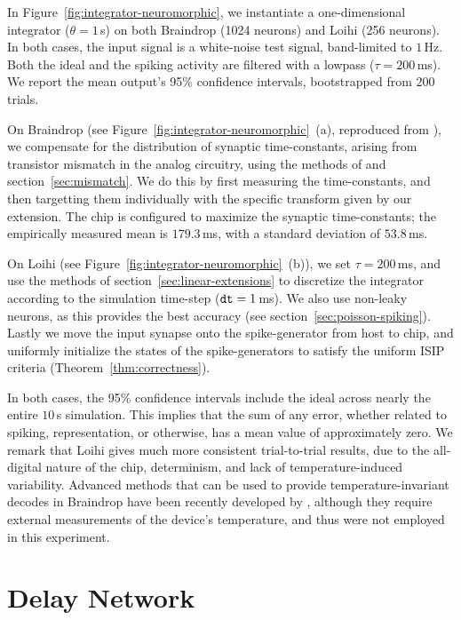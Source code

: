 In Figure~\ref{fig:integrator-neuromorphic}, we instantiate a one-dimensional integrator ($\theta = 1$\,s) on both Braindrop (1024 neurons) and Loihi (256 neurons).
In both cases, the input signal is a white-noise test signal, band-limited to $1$\,Hz.
Both the ideal and the spiking activity are filtered with a lowpass ($\tau = 200$\,ms).
We report the mean output's 95\% confidence intervals, bootstrapped from $200$ trials.

On Braindrop (see Figure~\ref{fig:integrator-neuromorphic}~(a), reproduced from \citet[][Figure~15]{braindrop2019}), we compensate for the distribution of synaptic time-constants, arising from transistor mismatch in the analog circuitry, using the methods of \citet{voelker2017iscas} and section~\ref{sec:mismatch}.
We do this by first measuring the time-constants, and then targetting them individually with the specific transform given by our extension.
The chip is configured to maximize the synaptic time-constants; the empirically measured mean is $179.3$\,ms, with a standard deviation of $53.8$\,ms.

On Loihi (see Figure~\ref{fig:integrator-neuromorphic}~(b)), we set $\tau = 200$\,ms, and use the methods of section~\ref{sec:linear-extensions} to discretize the integrator according to the simulation time-step ($\texttt{dt}{} = 1$\,ms).
We also use non-leaky neurons, as this provides the best accuracy (see section~\ref{sec:poisson-spiking}).
Lastly we move the input synapse onto the spike-generator from host to chip, and uniformly initialize the states of the spike-generators to satisfy the uniform ISIP criteria (Theorem~\ref{thm:correctness}).

In both cases, the 95\% confidence intervals include the ideal across nearly the entire $10$\,s simulation.
This implies that the sum of any error, whether related to spiking, representation, or otherwise, has a mean value of approximately zero.
We remark that Loihi gives much more consistent trial-to-trial results, due to the all-digital nature of the chip, determinism, and lack of temperature-induced variability.
Advanced methods that can be used to provide temperature-invariant decodes in Braindrop have been recently developed by \citet{reidpint2019}, although they require external measurements of the device's temperature, and thus were not employed in this experiment.

\section{Delay Network}
\label{sec:neuromorphic-dn}

